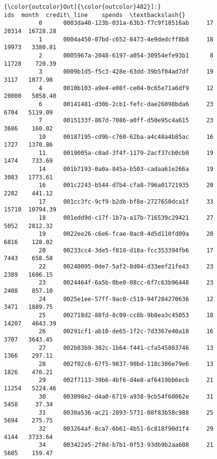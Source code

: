\documentclass[11pt]{article}
\begin{document}
\begin{Verbatim}[commandchars=\\\{\}]
{\color{outcolor}Out[{\color{outcolor}482}]:}                                         ids  month  credit\_line    spends  \textbackslash{}
          0      0003da40-123b-031a-63b3-f7c9f18516ab     17        20314  16728.28   
          1      0004a450-07bd-c652-8473-4e9dedcff8b8     18        19973   3380.81   
          2      0005967a-2048-6197-a054-30954efe93b1      8        11728    720.39   
          3      0009b1d5-f5c3-428e-63dd-39b5f04ad7df     19         3117   1077.98   
          4      0010b103-a9e4-e08f-ce04-0c65e71a6df9     12        20000   5058.40   
          6      00141481-d30b-2cb1-fefc-dae26098bda6     23         6704   5119.09   
          7      0015133f-867d-7086-a0ff-d50e95c4a615     23         3686    160.02   
          10     00187195-cd9b-c760-62ba-a4c48a4b85ac     16         1727   1370.86   
          11     0019005a-c0ad-3f4f-1179-2acf37cb0cb0     19         1474    733.69   
          14     001b7193-0a0a-845a-b503-cadaa61e266a     19         3083   1773.61   
          16     001c2243-b544-d7b4-cfa8-796a01721935     20         2282    441.12   
          17     001cc3fc-9cf9-b2db-bf8e-2727650dca1f     33        15710  10794.39   
          18     001edd9d-c17f-1b7a-a17b-716539c29421     27         5052   2812.32   
          19     0022ee26-c6e6-fcae-0ac0-4d5d110fd09a     20         6816    128.02   
          20     00233cc4-3de5-f810-d18a-fcc353394fb6     17         7443    658.58   
          22     00240095-0de7-5af2-8d04-d33eef21fe43     23         2389   1606.15   
          23     0024464f-6a5b-0be0-08cc-6f7c63b96448     23         2408    857.10   
          24     0025e1ee-57ff-9ac0-c519-94f284270636     12         3471   1889.75   
          25     002718d2-88fd-8c09-cc8b-9b8ea3c45053     18        14207   4643.39   
          26     00291cf1-ab10-de65-1f2c-7d3367e40a18     16         3707   3643.45   
          27     002b83b9-302c-1b64-f441-cfa545803746     13         1366    297.11   
          28     002f02c6-67f5-9837-90bd-118c306e79e6     13         1826    476.21   
          29     002f7113-39b6-4bf6-d4e8-af6419bb6ecb     21        11254   5224.46   
          30     003098e2-d4a0-6719-a938-9cb54f60062e     31         5458     37.34   
          31     0030a536-ac21-2893-5731-08f83b58c988     25         5694    275.75   
          32     003264af-8ca7-6b61-4b51-6c818f90d1f4     29         4144   3733.64   
          34     003422e5-2f8d-b7b1-0f53-93db9b2aa608     21         5685    159.47   

\end{Verbatim}
\end{document}
